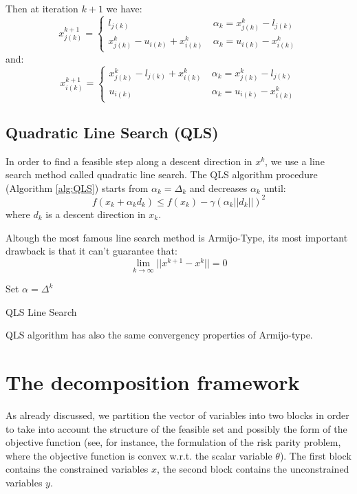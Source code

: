 Then at iteration $k+1$ we have:
\begin{equation*}
x^{k+1}_{j(k)}=\begin{cases}
 l_{j(k)} \ &\alpha_k=x^k_{j(k)}-l_{j(k)}\\
 x^k_{j(k)}-u_{i(k)} +x^k_{i(k)} \ &\alpha_k=u_{i(k)} -x^k_{i(k)}
 \end{cases}
\end{equation*}
and:
\begin{equation*}
x^{k+1}_{i(k)}=\begin{cases}
 x^k_{j(k)}-l_{j(k)}+x^k_{i(k)} \ &\alpha_k=x^k_{j(k)}-l_{j(k)}\\
 u_{i(k)} \ &\alpha_k=u_{i(k)}-x^k_{i(k)}
 \end{cases}
\end{equation*}
\subsection{Quadratic Line Search (QLS)}
In order to find a feasible step along a descent direction in $x^k$, we use a line search method called quadratic line search. The QLS algorithm procedure (Algorithm \ref{alg:QLS}) starts from $\alpha_k = \Delta_k$ and decreases $\alpha_k$ until:
\begin{equation}
f(x_k+\alpha_kd_k) \le  f(x_k)- \gamma (\alpha_k||d_k||)^2
\end{equation}
 where $d_k$ is a descent direction in $x_k$.

Altough the most famous line search method is Armijo-Type, its most important drawback is that it can't guarantee that:
\begin{equation}
 \displaystyle \lim_{k\rightarrow \infty} ||x^{k+1}-x^{k}|| =0
\end{equation}

 \begin{algorithm}[ht]
 Set $\alpha = \Delta^{k}$\\
 \caption{QLS Line Search}\label{alg:QLS}
\end{algorithm}

QLS algorithm has also the same convergency properties \cite{sciandrone-galligari-dilorenzo} of Armijo-type.
\section{The decomposition framework}
As already discussed, we partition the vector of variables into two blocks in order to take into account
the structure of the feasible set and possibly the form of the objective function (see, for instance,
the formulation of the risk parity problem, where the objective function is convex w.r.t. the scalar variable $\theta$).
The first block contains the constrained variables $x$, the second block contains
the unconstrained variables $y$. 

